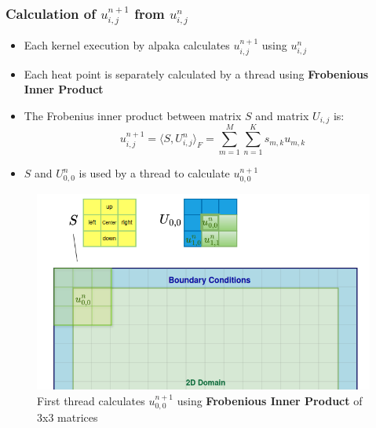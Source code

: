 \documentclass[9pt]{beamer}
\begin{document}
\begin{frame}
\frametitle{Calculation of $u_{i,j}^{n+1}$ from $u_{i,j}^{n}$}
\vspace{-0.1\baselineskip}
    \begin{itemize}
        \item Each kernel execution by alpaka calculates $u_{i,j}^{n+1}$ using $u_{i,j}^{n}$
        \item Each heat point is separately calculated by a thread using \textbf{Frobenious Inner Product}
        \item The Frobenius inner product between matrix \( S \) and matrix \( U_{i,j} \) is:
\[
 u_{i,j}^{n+1} = \langle S, U^{n}_{i,j} \rangle_F = \sum_{m=1}^{M} \sum_{n=1}^{K} s_{m,k} u_{m,k}
\]
        \item $S$ and $U^{n}_{0,0}$ is used  by a thread to calculate $u_{0,0}^{n+1}$
    \end{itemize}
    \begin{figure}
        \centering
            \includegraphics[width=0.75\linewidth, height=0.4\textheight]{Screenshot from 2024-09-22 00-16-53.png}
                \caption{First thread calculates $u_{0,0}^{n+1}$ using \textbf{Frobenious Inner Product} of 3x3 matrices}
        \label{fig:enter-label}
    \end{figure}
\end{frame}
\end{document}
